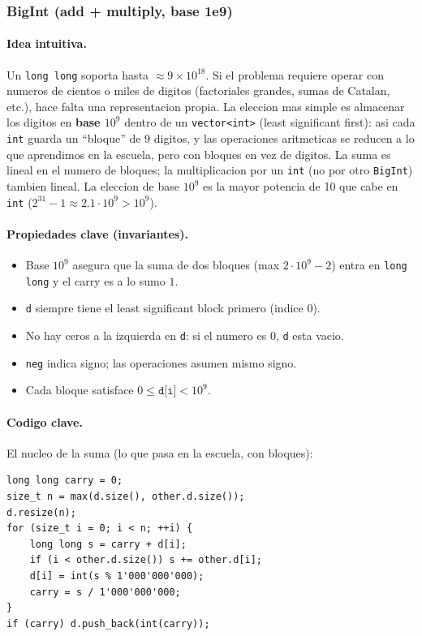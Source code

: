 ﻿\subsubsection{BigInt (add + multiply, base 1e9)}

\paragraph{Idea intuitiva.}
Un \texttt{long long} soporta hasta $\approx 9 \times 10^{18}$. Si el problema requiere operar con numeros de cientos o miles de digitos (factoriales grandes, sumas de Catalan, etc.), hace falta una representacion propia. La eleccion mas simple es almacenar los digitos en \textbf{base $10^9$} dentro de un \texttt{vector<int>} (least significant first): asi cada \texttt{int} guarda un ``bloque'' de 9 digitos, y las operaciones aritmeticas se reducen a lo que aprendimos en la escuela, pero con bloques en vez de digitos. La suma es lineal en el numero de bloques; la multiplicacion por un \texttt{int} (no por otro \texttt{BigInt}) tambien lineal. La eleccion de base $10^9$ es la mayor potencia de 10 que cabe en \texttt{int} ($2^{31} - 1 \approx 2.1 \cdot 10^9 > 10^9$).

\paragraph{Propiedades clave (invariantes).}
\begin{itemize}\setlength\itemsep{0pt}
	\item Base $10^9$ asegura que la suma de dos bloques (max $2 \cdot 10^9 - 2$) entra en \texttt{long long} y el carry es a lo sumo $1$.
	\item \texttt{d} siempre tiene el least significant block primero (indice 0).
	\item No hay ceros a la izquierda en \texttt{d}: si el numero es $0$, \texttt{d} esta vacio.
	\item \texttt{neg} indica signo; las operaciones asumen mismo signo.
	\item Cada bloque satisface $0 \le \texttt{d[i]} < 10^9$.
\end{itemize}

\paragraph{Codigo clave.}
El nucleo de la suma (lo que pasa en la escuela, con bloques):
\begin{verbatim}
long long carry = 0;
size_t n = max(d.size(), other.d.size());
d.resize(n);
for (size_t i = 0; i < n; ++i) {
    long long s = carry + d[i];
    if (i < other.d.size()) s += other.d[i];
    d[i] = int(s % 1'000'000'000);
    carry = s / 1'000'000'000;
}
if (carry) d.push_back(int(carry));
\end{verbatim}

